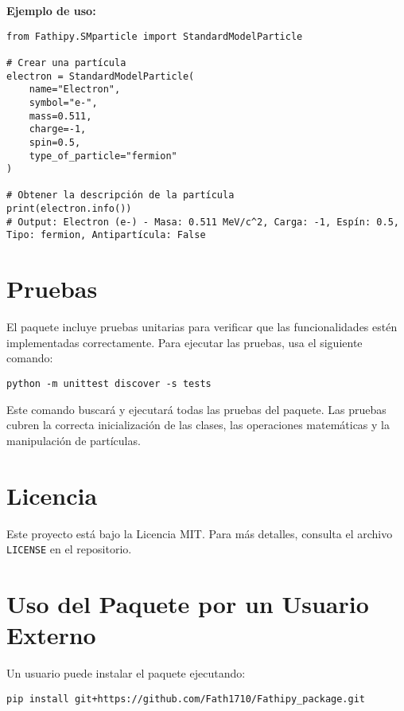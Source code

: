 \documentclass{article}
\begin{document}
\textbf{Ejemplo de uso:}
\begin{verbatim}
from Fathipy.SMparticle import StandardModelParticle

# Crear una partícula
electron = StandardModelParticle(
    name="Electron",
    symbol="e-",
    mass=0.511,
    charge=-1,
    spin=0.5,
    type_of_particle="fermion"
)

# Obtener la descripción de la partícula
print(electron.info())
# Output: Electron (e-) - Masa: 0.511 MeV/c^2, Carga: -1, Espín: 0.5, Tipo: fermion, Antipartícula: False
\end{verbatim}

\section{Pruebas}
El paquete incluye pruebas unitarias para verificar que las funcionalidades estén implementadas correctamente. Para ejecutar las pruebas, usa el siguiente comando:

\begin{verbatim}
python -m unittest discover -s tests
\end{verbatim}

Este comando buscará y ejecutará todas las pruebas del paquete. Las pruebas cubren la correcta inicialización de las clases, las operaciones matemáticas y la manipulación de partículas.

\section{Licencia}
Este proyecto está bajo la Licencia MIT. Para más detalles, consulta el archivo \texttt{LICENSE} en el repositorio.

\section{Uso del Paquete por un Usuario Externo}
Un usuario puede instalar el paquete ejecutando:

\begin{verbatim}
pip install git+https://github.com/Fath1710/Fathipy_package.git
\end{verbatim}
\end{document}
